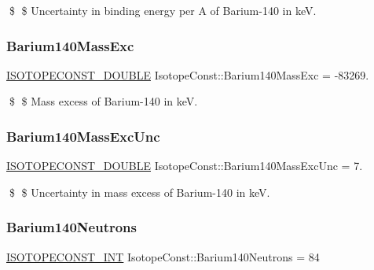 \$ \$ Uncertainty in binding energy per A of Barium-\/140 in keV. \mbox{\label{group___isotope_const-_barium-_ba140_ga13c29dfcd7cbfeba0be4b3a56f6bd1db}} 
\subsubsection{\texorpdfstring{Barium140\+Mass\+Exc}{Barium140MassExc}}
{\footnotesize\ttfamily \mbox{\hyperlink{group___isotope_const-_macros_ga8f45a7272ce02c0b4c65c44636ed719a}{I\+S\+O\+T\+O\+P\+E\+C\+O\+N\+S\+T\+\_\+\+D\+O\+U\+B\+LE}} Isotope\+Const\+::\+Barium140\+Mass\+Exc = -\/83269.}

\$ \$ Mass excess of Barium-\/140 in keV. \mbox{\label{group___isotope_const-_barium-_ba140_ga7bcf1e40da26e997d7a730214db56baf}} 
\subsubsection{\texorpdfstring{Barium140\+Mass\+Exc\+Unc}{Barium140MassExcUnc}}
{\footnotesize\ttfamily \mbox{\hyperlink{group___isotope_const-_macros_ga8f45a7272ce02c0b4c65c44636ed719a}{I\+S\+O\+T\+O\+P\+E\+C\+O\+N\+S\+T\+\_\+\+D\+O\+U\+B\+LE}} Isotope\+Const\+::\+Barium140\+Mass\+Exc\+Unc = 7.}

\$ \$ Uncertainty in mass excess of Barium-\/140 in keV. \mbox{\label{group___isotope_const-_barium-_ba140_gaff6950d3e20b4398fc3a76c70393abae}} 
\subsubsection{\texorpdfstring{Barium140\+Neutrons}{Barium140Neutrons}}
{\footnotesize\ttfamily \mbox{\hyperlink{group___isotope_const-_macros_ga5f18360b3e99483a35c32d789e62621c}{I\+S\+O\+T\+O\+P\+E\+C\+O\+N\+S\+T\+\_\+\+I\+NT}} Isotope\+Const\+::\+Barium140\+Neutrons = 84}

